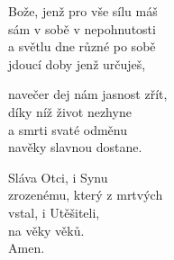 \begin{translatioMulticol}{3}
Bože, jenž pro vše sílu máš\\
sám v sobě v nepohnutosti\\
a světlu dne různé po sobě\\
jdoucí doby jenž určuješ,\columnbreak

navečer dej nám jasnost zřít,\\
díky níž život nezhyne\\
a smrti svaté odměnu\\
navěky slavnou dostane.\columnbreak

Sláva Otci, i Synu\\
zrozenému, který z mrtvých\\
vstal, i Utěšiteli,\\
na věky věků.\\
Amen.
\end{translatioMulticol}
